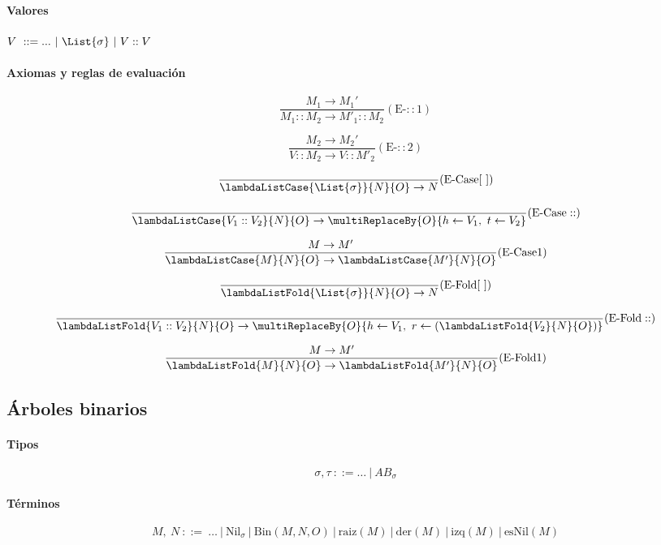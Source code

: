 \paragraph{Valores}
\(V~::= ...~|~\List{\sigma}~|~V::V\)

\paragraph{Axiomas y reglas de evaluación}
\begin{multicols}{2}
	\[\frac{M_1\to M_1'}{M_1 :: M_2 \to M'_1::M_2}(\text{E-}::\text{1})\]
	
	\vspace*{5mm}
	\[\frac{M_2\to M_2'}{V :: M_2 \to V::M'_2}(\text{E-}::\text{2})\]
	
	\vspace*{5mm}
	\[\frac{}{\lambdaListCase{\List{\sigma}}{N}{O}\to N}(\text{E-Case}[~])\]
	
\end{multicols}
	\vspace*{5mm}
\[\frac{}{\lambdaListCase{V_1::V_2}{N}{O}\to\multiReplaceBy{O}{h\leftarrow V_1,~t\leftarrow V_2}}(\text{E-Case}::)\]

\vspace*{5mm}
\[\frac{M\to M'}{\lambdaListCase{M}{N}{O}\to\lambdaListCase{M'}{N}{O}}(\text{E-Case}\text{1})\]

\vspace*{5mm}
\[\frac{}{\lambdaListFold{\List{\sigma}}{N}{O}\to N}(\text{E-Fold}[~])\]

\vspace*{5mm}
\[\frac{}{\lambdaListFold{V_1::V_2}{N}{O}\to \multiReplaceBy{O}{h\leftarrow V_1,~r\leftarrow(\lambdaListFold{V_2}{N}{O})}}(\text{E-Fold}::)\]

\vspace*{5mm}
\[\frac{M\to M'}{\lambdaListFold{M}{N}{O}\to\lambdaListFold{M'}{N}{O}}(\text{E-Fold}\text{1})\]


\subsection{Árboles binarios}

\paragraph{Tipos}
\[\sigma,\tau~::= \dots~|~AB_\sigma\]

\paragraph{Términos}
\[M,~N~::=~\dots~|~\text{Nil}_\sigma~|~\text{Bin}(M, N, O)~|~\text{raiz}(M)~|~\text{der}(M)~|~\text{izq}(M)~|~\text{esNil}(M)\]
